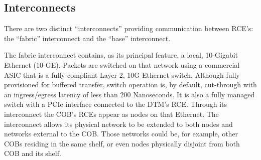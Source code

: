 \subsection{Interconnects}
\label{sec:Interconnects}
There are two distinct ``interconnects''  providing communication 
between RCE's: the
``fabric'' interconnect and the ``base'' interconnect.


The fabric interconnect contains, as its principal feature, 
a local, 10-Gigabit Ethernet (10-GE).
Packets are switched on that network using a commercial ASIC
that is a fully compliant Layer-2, 10G-Ethernet switch. 
Although fully provisioned for buffered transfer, switch operation is, 
by default, cut-through with an ingress/egress latency of less than 200 Nanoseconds.
It is also a fully managed switch with a PCIe interface connected to the DTM's RCE. 
Through its interconnect the COB's RCEs appear as nodes on that Ethernet. 
The interconnect allows its physical network to be extended to both nodes 
and networks external to the COB. 
Those networks could be, for example, other COBs residing in the same shelf, 
or even nodes physically disjoint from both COB and its shelf.
%

